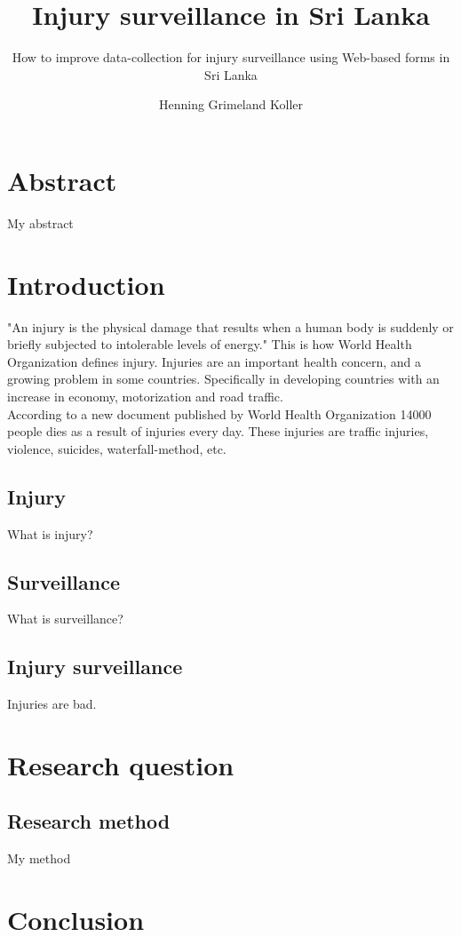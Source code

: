 \documentclass[UKenglish]{ifimaster}
\title{Injury surveillance in Sri Lanka}
\subtitle{How to improve data-collection for injury surveillance
using Web-based forms in Sri Lanka}
\author{Henning Grimeland Koller}
\newcommand{\WHO}{World Health Organization }
\begin{document}
\ififorside{}
\frontmatter{}
\maketitle{}

\chapter*{Abstract}
My abstract
\tableofcontents{}
\listoffigures{}
\listoftables{}
\mainmatter{}

\chapter*{Introduction}
"An injury is the physical damage that results when a human body is suddenly or briefly subjected to intolerable levels of energy."\cite[5]{who-guide}
This is how \WHO defines injury. Injuries are an important health concern, and a growing problem in some countries. Specifically in developing countries with an increase in economy, motorization and road traffic.
\\
According to a new document published by \WHO\cite{who-article} 14000 people dies as a result of injuries every day.
These injuries are traffic injuries, violence, suicides, waterfall-method, etc.
\section{Injury}
What is injury?
\section{Surveillance}
What is surveillance?
\section{Injury surveillance}
Injuries are bad. 

\chapter*{Research question}
\section{Research method}
My method

\chapter{Conclusion}

\backmatter{}
\printbibliography
\end{document}
